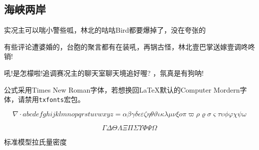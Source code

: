 \subsection{海峡两岸}

实况主可以喘小警些呱，林北的咕咕Bird都要爆掉了，没在夸张的

有些评论遭婆婚的，台胞的聚言都有在装吼，再锅古怪，林北壹巴掌送嫁壹调咚咚销!

吼!是怎檬啦!追调赛况主的聊天室聊天境追好喔? ，氛真是有狗呐!

公式采用Times New Roman字体，若想换回\LaTeX 默认的Computer Mordern字体，请禁用\lstinline|txfonts|宏包。

\begin{equation}
\label{testfonts}
\nabla \cdot abcdefghijklmnopqrstuvwxyz=\alpha \beta \gamma \delta \epsilon \varepsilon \zeta \eta \theta \vartheta \iota \kappa \lambda \mu \nu \xi o \pi \varpi \rho \varrho \sigma \varsigma \tau \upsilon \phi \varphi \chi \psi \omega
\end{equation}

\begin{equation}
    \label{testfonts2}
    \Gamma \Delta \Theta \Lambda \Xi \Pi \Sigma \Upsilon \Phi \Psi \Omega
\end{equation}

标准模型拉氏量密度

